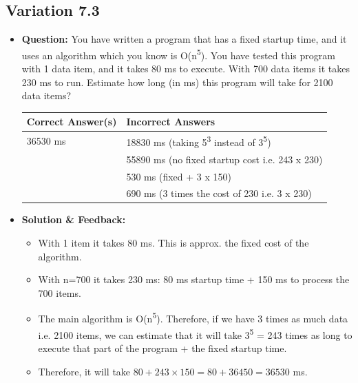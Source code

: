 \subsection{Variation 7.3}
\begin{itemize}
    \item \textbf{Question:} You have written a program that has a fixed startup time, and it uses an algorithm which you know is O(n\textsuperscript{5}). You have tested this program with 1 data item, and it takes 80 ms to execute. With 700 data items it takes 230 ms to run. Estimate how long (in ms) this program will take for 2100 data items?
    
    \begin{tabular}{|l|l|}
        \hline
        \textbf{Correct Answer(s)} & \textbf{Incorrect Answers} \\
        \hline
        36530 ms & 18830 ms (taking 5\textsuperscript{3} instead of 3\textsuperscript{5}) \\
         & 55890 ms (no fixed startup cost i.e. 243 x 230) \\
         & 530 ms (fixed + 3 x 150) \\
         & 690 ms (3 times the cost of 230 i.e. 3 x 230) \\
        \hline
    \end{tabular}
    
    \item \textbf{Solution \& Feedback:}
    \begin{itemize}
        \item With 1 item it takes 80 ms. This is approx. the fixed cost of the algorithm.
        \item With n=700 it takes 230 ms: 80 ms startup time + 150 ms to process the 700 items.
        \item The main algorithm is O(n\textsuperscript{5}). Therefore, if we have 3 times as much data i.e. 2100 items, we can estimate that it will take 3\textsuperscript{5} = 243 times as long to execute that part of the program + the fixed startup time.
        \item Therefore, it will take \( 80 + 243 \times 150 = 80 + 36450 = 36530 \) ms.
    \end{itemize}
\end{itemize}
